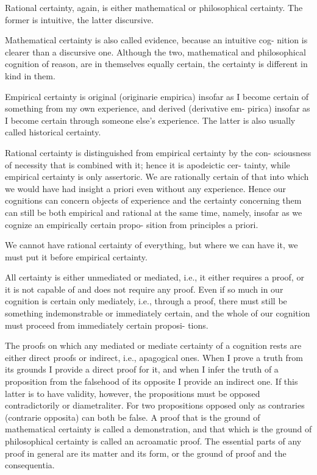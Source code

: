 Rational certainty, again, is either
mathematical or philosophical certainty.
The former is intuitive, the latter discursive.

Mathematical certainty is also called evidence, because an intuitive cog-
nition is clearer than a discursive one. Although the two, mathematical
and philosophical cognition of reason, are in themselves equally certain,
the certainty is different in kind in them.

Empirical certainty is original (originarie empirica) insofar as I become
certain of something from my own experience, and derived (derivative em-
pirica) insofar as I become certain through someone else's experience. The
latter is also usually called historical certainty.

Rational certainty is distinguished from empirical certainty by the con-
sciousness of necessity that is combined with it; hence it is apodeictic cer-
tainty, while empirical certainty is only assertoric. We are rationally certain
of that into which we would have had insight a priori even without any
experience. Hence our cognitions can concern objects of experience and
the certainty concerning them can still be both empirical and rational at
the same time, namely, insofar as we cognize an empirically certain propo-
sition from principles a priori.

We cannot have rational certainty of everything, but where we can have
it, we must put it before empirical certainty.

All certainty is either unmediated or mediated, i.e., it either requires a
proof, or it is not capable of and does not require any proof. Even if so
much in our cognition is certain only mediately, i.e., through a proof,
there must still be something indemonstrable or immediately certain, and the
whole of our cognition must proceed from immediately certain proposi-
tions.

The proofs on which any mediated or mediate certainty of a cognition
rests are either direct proofs or indirect, i.e., apagogical ones.
When I prove a truth from its grounds I provide a direct proof for it,
and when I infer the truth of a proposition from the falsehood of its
opposite I provide an indirect one.
If this latter is to have validity, however,
the propositions must be opposed contradictorily or diametraliter.
For two propositions opposed only as contraries (contrarie opposita) can both be false.
A proof that is the ground of mathematical certainty is called a demonstration,
and that which is the ground of philosophical certainty is called an acroamatic proof.
The essential parts of any proof in general are its matter and its form,
or the ground of proof and the consequentia.

